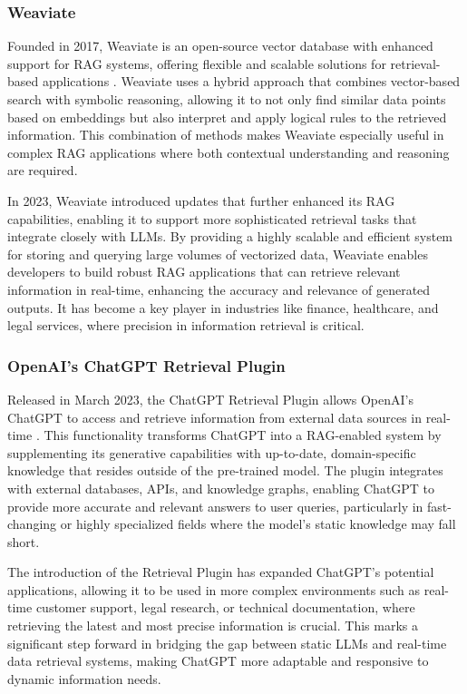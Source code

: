 \subsubsection{Weaviate}

Founded in 2017, Weaviate is an open-source vector database with enhanced support for RAG systems, offering flexible and scalable solutions for retrieval-based applications \cite{Weaviate}. 
Weaviate uses a hybrid approach that combines vector-based search with symbolic reasoning, allowing it to not only find similar data points based on embeddings but also interpret and apply logical rules to the retrieved information. 
This combination of methods makes Weaviate especially useful in complex RAG applications where both contextual understanding and reasoning are required.

In 2023, Weaviate introduced updates that further enhanced its RAG capabilities, enabling it to support more sophisticated retrieval tasks that integrate closely with LLMs. 
By providing a highly scalable and efficient system for storing and querying large volumes of vectorized data, Weaviate enables developers to build robust RAG applications that can retrieve relevant information in real-time, enhancing the accuracy and relevance of generated outputs. 
It has become a key player in industries like finance, healthcare, and legal services, where precision in information retrieval is critical.

\subsubsection{OpenAI's ChatGPT Retrieval Plugin}

Released in March 2023, the ChatGPT Retrieval Plugin allows OpenAI's ChatGPT to access and retrieve information from external data sources in real-time \cite{ChatGPTRetrievalPlugin}. 
This functionality transforms ChatGPT into a RAG-enabled system by supplementing its generative capabilities with up-to-date, domain-specific knowledge that resides outside of the pre-trained model. 
The plugin integrates with external databases, APIs, and knowledge graphs, enabling ChatGPT to provide more accurate and relevant answers to user queries, particularly in fast-changing or highly specialized fields where the model's static knowledge may fall short.

The introduction of the Retrieval Plugin has expanded ChatGPT's potential applications, allowing it to be used in more complex environments such as real-time customer support, legal research, or technical documentation, where retrieving the latest and most precise information is crucial. 
This marks a significant step forward in bridging the gap between static LLMs and real-time data retrieval systems, making ChatGPT more adaptable and responsive to dynamic information needs.

